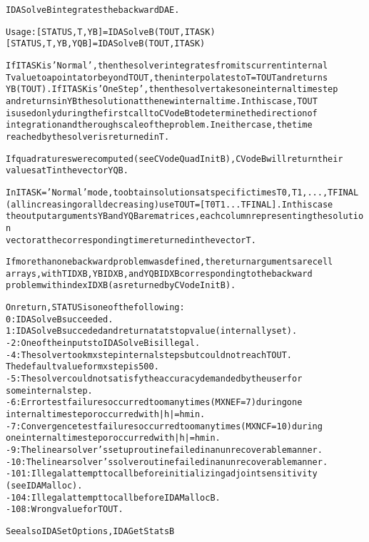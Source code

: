 \begin{alltt}
IDASolveB integrates the backward DAE.

   Usage:  [STATUS, T, YB] = IDASolveB ( TOUT, ITASK ) 
           [STATUS, T, YB, YQB] = IDASolveB ( TOUT, ITASK )

   If ITASK is 'Normal', then the solver integrates from its current internal 
   T value to a point at or beyond TOUT, then interpolates to T = TOUT and returns 
   YB(TOUT). If ITASK is 'OneStep', then the solver takes one internal time step 
   and returns in YB the solution at the new internal time. In this case, TOUT 
   is used only during the first call to CVodeB to determine the direction of 
   integration and the rough scale of the problem. In either case, the time 
   reached by the solver is returned in T. 

   If quadratures were computed (see CVodeQuadInitB), CVodeB will return their
   values at T in the vector YQB.

   In ITASK =' Normal' mode, to obtain solutions at specific times T0,T1,...,TFINAL
   (all increasing or all decreasing) use TOUT = [T0 T1  ... TFINAL]. In this case
   the output arguments YB and YQB are matrices, each column representing the solution
   vector at the corresponding time returned in the vector T.

   If more than one backward problem was defined, the return arguments are cell
   arrays, with T{IDXB}, YB{IDXB}, and YQB{IDXB} corresponding to the backward
   problem with index IDXB (as returned by CVodeInitB).

   On return, STATUS is one of the following:
     0: IDASolveB succeeded.
     1: IDASolveB succeded and return at a tstop value (internally set).
    -2: One of the inputs to IDASolveB is illegal.
    -4: The solver took mxstep internal steps but could not reach TOUT. 
        The default value for mxstep is 500.
   -5:  The solver could not satisfy the accuracy demanded by the user for 
        some internal step.
   -6:  Error test failures occurred too many times (MXNEF = 7) during one 
        internal time step or occurred with |h| = hmin.
   -7:  Convergence test failures occurred too many times (MXNCF = 10) during 
        one internal time step or occurred with |h| = hmin.
   -9:  The linear solver's setup routine failed in an unrecoverable manner.
  -10:  The linear solver's solve routine failed in an unrecoverable manner.
  -101: Illegal attempt to call before initializing adjoint sensitivity 
        (see IDAMalloc).
  -104: Illegal attempt to call before IDAMallocB.
  -108: Wrong value for TOUT.

   See also IDASetOptions, IDAGetStatsB
\end{alltt}






\vspace{0.1in}